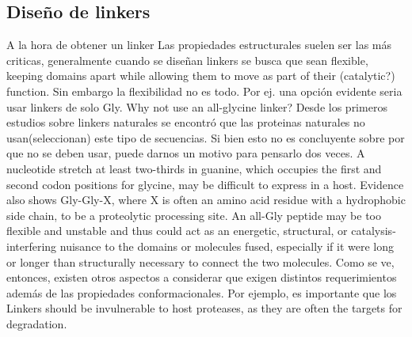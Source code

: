 % 
% 
% 
% 









































  
  
  
  
  
  
  
  
  
  
  
\subsection{Diseño de linkers}
\label{linkerDesign}
A la hora de obtener un linker 
Las propiedades estructurales suelen ser las más criticas, generalmente cuando se diseñan linkers se busca que sean flexible, keeping domains apart while allowing them to move as part of their (catalytic?) function. 
Sin embargo la flexibilidad no es todo. 
Por ej. una opción evidente seria usar linkers de solo Gly.
Why not use an all-glycine linker? 
Desde los primeros estudios sobre linkers naturales \cite{argos1990investigation} se encontró que las proteinas naturales no usan(seleccionan) este tipo de secuencias.
Si bien esto no es concluyente sobre por que no se deben usar, puede darnos un motivo para pensarlo dos veces.
A nucleotide stretch at least two-thirds in guanine, which occupies the first and second codon positions for glycine, may be difficult to express in a host.
Evidence also shows Gly-Gly-X, where X is often an amino acid residue with a hydrophobic side chain, to be a proteolytic processing site.
An all-Gly peptide may be too flexible and unstable and thus could act as an energetic, structural, or catalysis-interfering nuisance to the
domains or molecules fused, especially if it were long or longer than structurally necessary to connect the two molecules.
Como se ve, entonces, existen otros aspectos a considerar que exigen distintos requerimientos además de las propiedades conformacionales.
Por ejemplo, es importante que los Linkers should be invulnerable to host proteases, as they are often the targets for degradation. 

